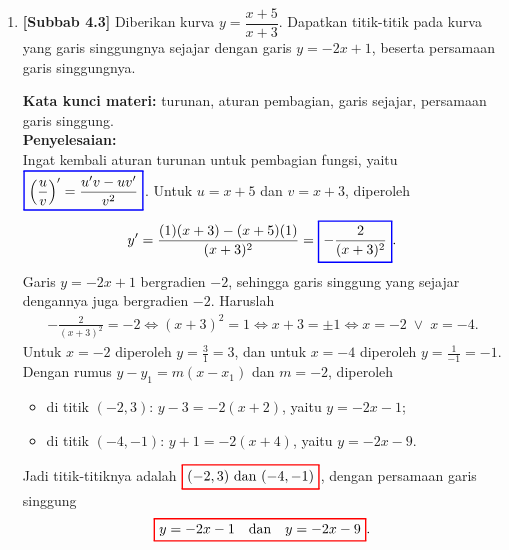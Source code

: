 \documentclass[10pt,openany,a4paper]{article}
\theoremstyle{definition}
\theoremstyle{definition}
\theoremstyle{plain}
\newenvironment{jawab}[2][tes]{%
\par\noindent\textbf{Kata kunci materi:} #1.\\
\textbf{Penyelesaian:} #2%
}{}
\begin{document}
\begin{enumerate}
    \item \textbf{[Subbab 4.3]} Diberikan kurva $y=\dfrac{x+5}{x+3}$. Dapatkan titik-titik pada kurva yang garis singgungnya sejajar dengan garis $y=-2x+1$, beserta persamaan garis singgungnya.
    \begin{jawab}[turunan, aturan pembagian, garis sejajar, persamaan garis singgung]{~\\
        Ingat kembali aturan turunan untuk pembagian fungsi, yaitu $\colorlet{oldcolor}{.}
        \color{blue}
        \setlength{\fboxrule}{1pt} \boxed{\color{oldcolor}\left(\frac{u}{v}\right)' = \frac{u'v - uv'}{v^2}}\color{oldcolor}$. Untuk $u=x+5$ dan $v=x+3$, diperoleh
        \begin{align*}
            y' = \frac{(1)(x+3)-(x+5)(1)}{(x+3)^2} = \colorlet{oldcolor}{.}
        \color{blue}
        \setlength{\fboxrule}{1pt} \boxed{\color{oldcolor}-\frac{2}{(x+3)^2}}\color{oldcolor}.
        \end{align*}
        Garis $y=-2x+1$ bergradien $-2$, sehingga garis singgung yang sejajar dengannya juga bergradien $-2$. Haruslah
        \begin{align*}
            -\frac{2}{(x+3)^2} = -2 \iff (x+3)^2=1 \iff x+3=\pm 1 \iff x=-2 \;\vee\; x=-4.
        \end{align*}
        Untuk $x=-2$ diperoleh $y=\frac{3}{1}=3$, dan untuk $x=-4$ diperoleh $y=\frac{1}{-1}=-1$. Dengan rumus $y - y_1 = m(x - x_1)$ dan $m=-2$, diperoleh
        \begin{itemize}
            \item di titik $(-2,3)$: $y-3=-2(x+2)$, yaitu $y=-2x-1$;
            \item di titik $(-4,-1)$: $y+1=-2(x+4)$, yaitu $y=-2x-9$.
        \end{itemize}
        Jadi titik-titiknya adalah $\colorlet{oldcolor}{.}
        \color{red}
        \setlength{\fboxrule}{1pt} \boxed{\color{oldcolor}(-2,3) \text{ dan } (-4,-1)}\color{oldcolor}$, dengan persamaan garis singgung
        \[\colorlet{oldcolor}{.}
        \color{red}
        \setlength{\fboxrule}{1pt} \boxed{\color{oldcolor}y=-2x-1 \quad\text{dan}\quad y=-2x-9}\color{oldcolor}.\]
    }
    \end{jawab}

\end{enumerate}

\newpage
\end{document}
